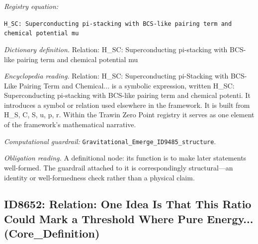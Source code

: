 \documentclass[11pt]{article}
\theoremstyle{remark}
\begin{document}
\noindent\textit{Registry equation:}\par
{\small\texttt{H\_SC: Superconducting pi-stacking with BCS-like pairing term and chemical potential mu}}\par\medskip
\noindent\textit{Dictionary definition.} Relation: H\_SC: Superconducting pi-stacking with BCS-like pairing term and chemical potential mu\par\medskip
\noindent\textit{Encyclopedia reading.} Relation: H\_SC: Superconducting pi-Stacking with BCS-Like Pairing Term and Chemical... is a symbolic expression, written H\_SC: Superconducting pi-stacking with BCS-like pairing term and chemical potenti. It introduces a symbol or relation used elsewhere in the framework. It is built from H\_S, C, S, u, p, r. Within the Trawin Zero Point registry it serves as one element of the framework's mathematical narrative.
\par\medskip\noindent\textit{Computational guardrail:} \texttt{Gravitational\_Emerge\_ID9485\_structure}.
\par\medskip\noindent\textit{Obligation reading.} A definitional node: its function is to make later statements well-formed. The guardrail attached to it is correspondingly structural---an identity or well-formedness check rather than a physical claim.

\subsection{ID8652: Relation: One Idea Is That This Ratio Could Mark a Threshold Where Pure Energy... (Core\_Definition)}
\end{document}

